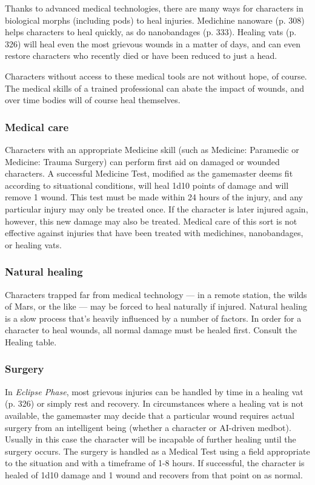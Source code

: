 Thanks to advanced medical technologies, there are many ways for characters in biological morphs (including pods) to heal injuries. Medichine nanoware (p. 308) helps characters to heal quickly, as do nanobandages (p. 333). Healing vats (p. 326) will heal even the most grievous wounds in a matter of days, and can even restore characters who recently died or have been reduced to just a head.

Characters without access to these medical tools are not without hope, of course. The medical skills of a trained professional can abate the impact of wounds, and over time bodies will of course heal themselves.

\subsubsection{Medical care}

Characters with an appropriate Medicine skill (such as Medicine: Paramedic or Medicine: Trauma Surgery) can perform first aid on damaged or wounded characters. A successful Medicine Test, modified as the gamemaster deems fit according to situational conditions, will heal 1d10 points of damage and will remove 1 wound. This test must be made within 24 hours of the injury, and any particular injury may only be treated once. If the character is later injured again, however, this new damage may also be treated. Medical care of this sort is not effective against injuries that have been treated with medichines, nanobandages, or healing vats.

\subsubsection{Natural healing}

Characters trapped far from medical technology --- in a remote station, the wilds of Mars, or the like --- may be forced to heal naturally if injured. Natural healing is a slow process that’s heavily influenced by a number of factors. In order for a character to heal wounds, all normal damage must be healed first. Consult the Healing table.

\subsubsection{Surgery}

In \emph{Eclipse Phase}, most grievous injuries can be handled by time in a healing vat (p. 326) or simply rest and recovery. In circumstances where a healing vat is not available, the gamemaster may decide that a particular wound requires actual surgery from an intelligent being (whether a character or AI-driven medbot). Usually in this case the character will be incapable of further healing until the surgery occurs. The surgery is handled as a Medical Test using a field appropriate to the situation and with a timeframe of 1-8 hours. If successful, the character is healed of 1d10 damage and 1 wound and recovers from that point on as normal.

